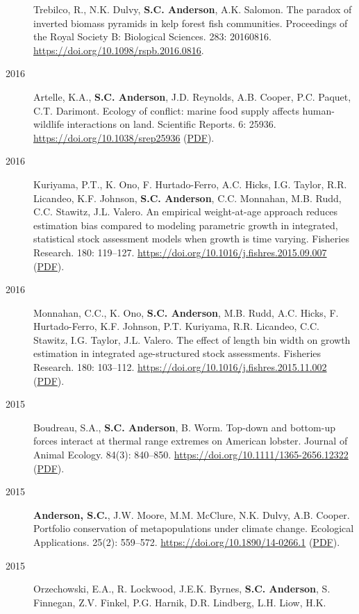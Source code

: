 \begin{description}
Trebilco, R., N.K. Dulvy, \textbf{S.C. Anderson}, A.K. Salomon. The
paradox of inverted biomass pyramids in kelp forest fish communities.
Proceedings of the Royal Society B: Biological Sciences. 283: 20160816.
\url{https://doi.org/10.1098/rspb.2016.0816}.
\item[2016]
Artelle, K.A., \textbf{S.C. Anderson}, J.D. Reynolds, A.B. Cooper, P.C.
Paquet, C.T. Darimont. Ecology of conflict: marine food supply affects
human-wildlife interactions on land. Scientific Reports. 6: 25936.
\url{https://doi.org/10.1038/srep25936}
(\href{http://www.nature.com/articles/srep25936.pdf}{PDF}).
\item[2016]
Kuriyama, P.T., K. Ono, F. Hurtado-Ferro, A.C. Hicks, I.G. Taylor, R.R.
Licandeo, K.F. Johnson, \textbf{S.C. Anderson}, C.C. Monnahan, M.B.
Rudd, C.C. Stawitz, J.L. Valero. An empirical weight-at-age approach
reduces estimation bias compared to modeling parametric growth in
integrated, statistical stock assessment models when growth is time
varying. Fisheries Research. 180: 119--127.
\url{https://doi.org/10.1016/j.fishres.2015.09.007}
(\href{https://www.dropbox.com/s/425a18a4xm9kq8l/Kuriyama_etal_2016_empirical.pdf?dl=1}{PDF}).
\item[2016]
Monnahan, C.C., K. Ono, \textbf{S.C. Anderson}, M.B. Rudd, A.C. Hicks,
F. Hurtado-Ferro, K.F. Johnson, P.T. Kuriyama, R.R. Licandeo, C.C.
Stawitz, I.G. Taylor, J.L. Valero. The effect of length bin width on
growth estimation in integrated age-structured stock assessments.
Fisheries Research. 180: 103--112.
\url{https://doi.org/10.1016/j.fishres.2015.11.002}
(\href{https://www.dropbox.com/s/uksmdtptby9w0ku/Monnahan_etal_2016_binwidth.pdf?dl=1}{PDF}).
\item[2015]
Boudreau, S.A., \textbf{S.C. Anderson}, B. Worm. Top-down and bottom-up
forces interact at thermal range extremes on American lobster. Journal
of Animal Ecology. 84(3): 840--850.
\url{https://doi.org/10.1111/1365-2656.12322}
(\href{https://www.dropbox.com/s/w027swfx2o8hgvl/Boudreau_etal_2015_lobster.pdf?dl=1}{PDF}).
\item[2015]
\textbf{Anderson, S.C.}, J.W. Moore, M.M. McClure, N.K. Dulvy, A.B.
Cooper. Portfolio conservation of metapopulations under climate change.
Ecological Applications. 25(2): 559--572.
\url{https://doi.org/10.1890/14-0266.1}
(\href{https://www.dropbox.com/s/141rsnv5rc7mi5i/Anderson_etal_2015_salmonportfolios.pdf?dl=1}{PDF}).
\item[2015]
Orzechowski, E.A., R. Lockwood, J.E.K. Byrnes, \textbf{S.C. Anderson},
S. Finnegan, Z.V. Finkel, P.G. Harnik, D.R. Lindberg, L.H. Liow, H.K.

\end{description}
